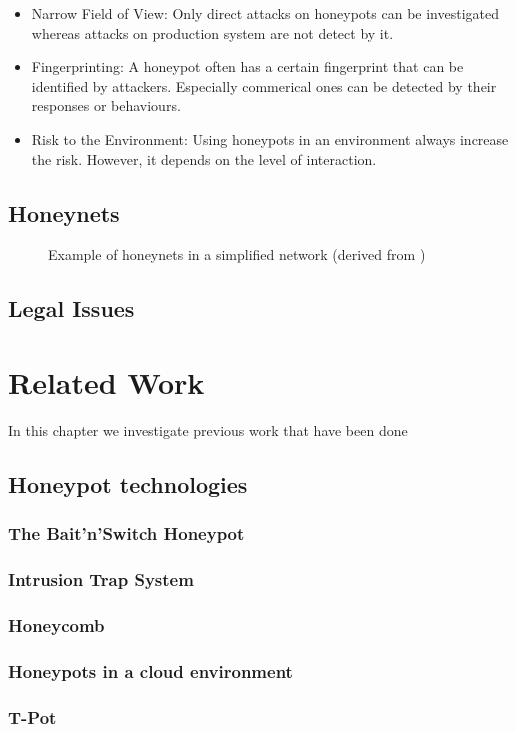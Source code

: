 \begin{itemize}
    \item Narrow Field of View: Only direct attacks on honeypots can be investigated whereas attacks on production system are not detect by it.
    \item Fingerprinting: A honeypot often has a certain fingerprint that can be identified by attackers. Especially commerical ones can be detected by their responses or behaviours. 
    \item Risk to the Environment: Using honeypots in an environment always increase the risk. However, it depends on the level of interaction.
\end{itemize}

\subsection{Honeynets}

\begin{figure}[h]
    \centering
    
    \caption{Example of honeynets in a simplified network (derived from \cite{Spitzner2003})}
    \label{fig:honeynet-example}
\end{figure}

\cite{Spitzner2003}

\subsection{Legal Issues}

\cite{Spitzner2003}

\section{Related Work}

In this chapter we investigate previous work that have been done

\subsection{Honeypot technologies}

\subsubsection{The Bait'n'Switch Honeypot}

\cite{Diebold2005}

\subsubsection{Intrusion Trap System}

\cite{Diebold2005}

\subsubsection{Honeycomb}

\cite{Diebold2005}

\subsubsection{Honeypots in a cloud environment}

\cite{Kelly2021}

\subsubsection{T-Pot}

